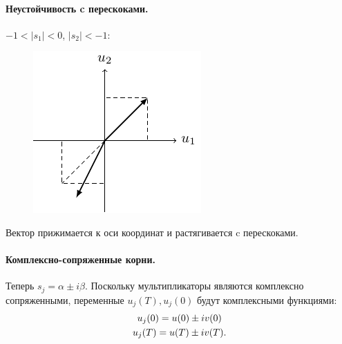 \paragraph{Неустойчивость c перескоками. } $-1<|s_1|<0$, $|s_2|<-1$:
\begin{figure}[H]
	\centering
	\includegraphics[scale=1.5]{img/parametric_oscillations/sj_4}   
\end{figure}

Вектор прижимается к оси координат и растягивается c перескоками.


\paragraph{Комплексно-сопряженные корни. } Теперь $s_j=\alpha \pm i\beta$. Поскольку мультипликаторы являются комплексно сопряженными, переменные $u_j(T), u_j(0)$ будут комплексными функциями:
\begin{gather}
	u_j(0)=u(0)\pm iv(0) \notag \\ 
	u_j(T)=u(T)\pm iv(T).		
	\label{eq:71}
\end{gather}

